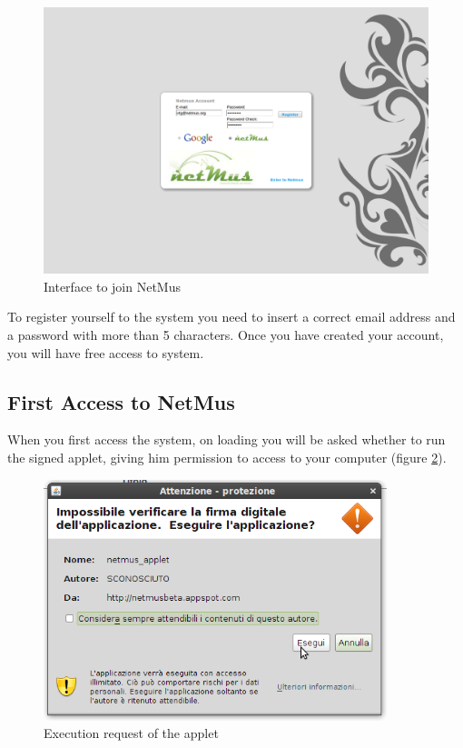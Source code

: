 \begin{figure}[!htbp]
  \centering
  \includegraphics[width=14cm]{img/MU/registration.png}
\caption{Interface to join NetMus}
\label{fig:registrazione}
\end{figure}

To register yourself to the system you need to insert a correct email address
and a password with more than 5 characters. Once you have created your account,
you will have free access to  system.

\newpage
\subsection{First Access to NetMus}

When you first access the system, on loading you
will be asked whether to run the signed applet, giving him permission to access
to your computer (figure \ref{fig:permessiApplet}).
\begin{figure}[!htbp]
  \centering
  \includegraphics[width=10cm]{img/MU/permessi_applet.png}
\caption{Execution request of the applet}
\label{fig:permessiApplet}
\end{figure}

